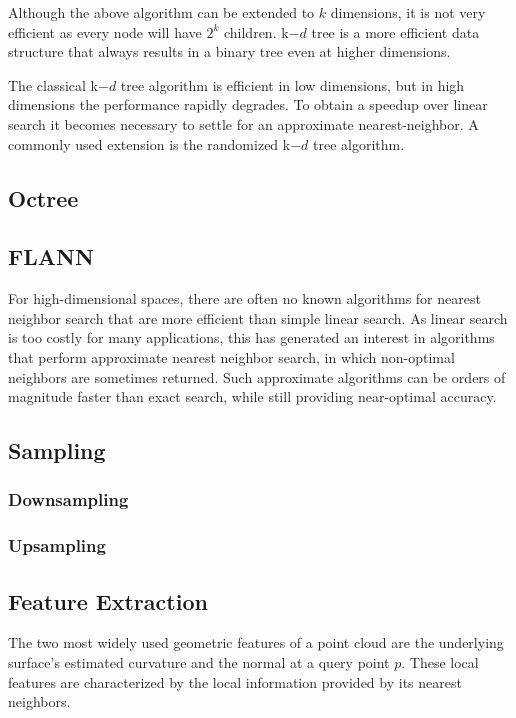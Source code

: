 Although the above algorithm can be extended to $k$ dimensions, it is not very efficient as every node will have $2^k$ children. k$-d$ tree is a more efficient data structure that always results in a binary tree even at higher dimensions.


The classical k$-d$ tree algorithm is efficient in low dimensions, but in high dimensions the performance rapidly degrades. To obtain a speedup over linear search it becomes necessary to settle for an approximate nearest-neighbor. A commonly used extension is the randomized k$-d$ tree algorithm.

\subsection{Octree}

\subsection{FLANN}
For high-dimensional spaces, there are often no known algorithms for nearest neighbor search that are more efficient than simple linear search. As linear search is too costly for many applications, this has generated an interest in algorithms that perform approximate nearest neighbor search, in which non-optimal neighbors are sometimes returned. Such approximate algorithms can be orders of magnitude faster than exact search, while still providing near-optimal accuracy.


\subsection{Sampling}

\subsubsection{Downsampling}

\subsubsection{Upsampling}



\subsection{Feature Extraction}

The two most widely used geometric features of a point cloud are the underlying surface's estimated curvature and the normal at a query point $p$. These local features are characterized by the local information provided by its nearest neighbors.

